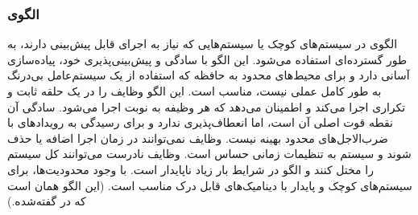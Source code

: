 \subsubsection{الگوی }
\label{archConCyclicExecSec}
\begin{RTL}
الگوی  \cite{ref4} در سیستم‌های کوچک
یا سیستم‌هایی که نیاز به اجرای قابل پیش‌بینی دارند، به طور گسترده‌ای استفاده می‌شود.
این الگو با سادگی و پیش‌بینی‌پذیری خود، پیاده‌سازی آسانی دارد و برای محیط‌های محدود به
حافظه که استفاده از یک سیستم‌عامل بی‌درنگ به طور
کامل عملی نیست، مناسب است. این الگو وظایف
را در یک حلقه ثابت و تکراری اجرا می‌کند و اطمینان می‌دهد که هر
وظیفه به نوبت اجرا می‌شود. سادگی آن نقطه قوت اصلی آن
است، اما انعطاف‌پذیری ندارد و برای رسیدگی به رویدادهای با ضرب‌الاجل‌های
محدود بهینه نیست. وظایف نمی‌توانند در زمان اجرا اضافه یا
حذف شوند و سیستم به تنظیمات زمانی حساس است.
وظایف نادرست می‌توانند کل سیستم را مختل کنند و
الگو در شرایط بار زیاد ناپایدار است. با وجود محدودیت‌ها، برای
سیستم‌های کوچک و پایدار با دینامیک‌های قابل درک مناسب است.
(این الگو همان  است که
در \cite{ref1} گفته‌شده.)
\end{RTL}